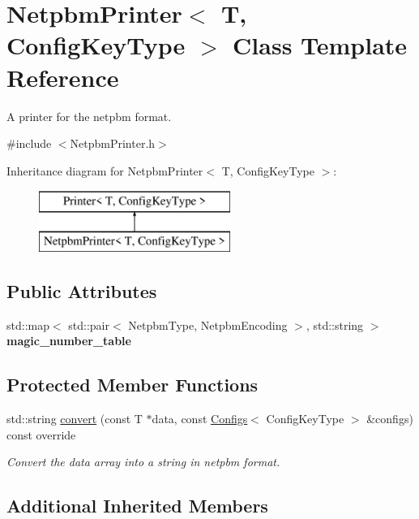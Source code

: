 \hypertarget{class_netpbm_printer}{}\section{Netpbm\+Printer$<$ T, Config\+Key\+Type $>$ Class Template Reference}
\label{class_netpbm_printer}


A printer for the netpbm format.  




{\ttfamily \#include $<$Netpbm\+Printer.\+h$>$}

Inheritance diagram for Netpbm\+Printer$<$ T, Config\+Key\+Type $>$\+:\begin{figure}[H]
\begin{center}
\leavevmode
\includegraphics[height=2.000000cm]{class_netpbm_printer}
\end{center}
\end{figure}
\subsection*{Public Attributes}
\begin{DoxyCompactItemize}
\item 
std\+::map$<$ std\+::pair$<$ Netpbm\+Type, Netpbm\+Encoding $>$, std\+::string $>$ {\bfseries magic\+\_\+number\+\_\+table}
\end{DoxyCompactItemize}
\subsection*{Protected Member Functions}
\begin{DoxyCompactItemize}
\item 
std\+::string \mbox{\hyperlink{class_netpbm_printer_a7a361fc4d114a12cb5c2311744dc3d3d}{convert}} (const T $\ast$data, const \mbox{\hyperlink{class_configs}{Configs}}$<$ Config\+Key\+Type $>$ \&configs) const override
\begin{DoxyCompactList}\small\item\em Convert the data array into a string in netpbm format. \end{DoxyCompactList}\end{DoxyCompactItemize}
\subsection*{Additional Inherited Members}


